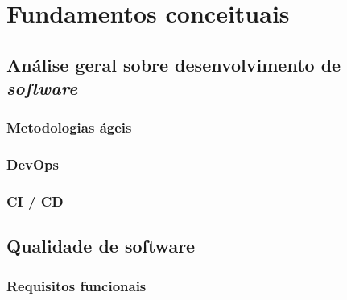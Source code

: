 \documentclass[]{../class/politex}
\begin{document}
  \capa
  \falsafolhaderosto
  \folhaderosto


  


  \begin{resumo}
  \end{resumo}

  \begin{abstract}
  \end{abstract}

  \listadefiguras

  \listadetabelas

  \sumario

  

  \part{Fundamentos conceituais}

    \chapter{Análise geral sobre desenvolvimento de \textit{software}}

      \section{Metodologias ágeis}

      \section{DevOps}

      \section{CI / CD}

    \chapter{Qualidade de software}

      \section{Requisitos funcionais}
\end{document}
